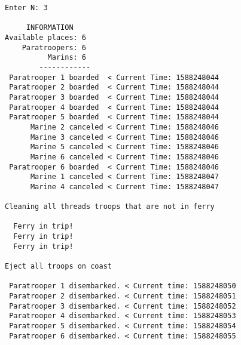 \documentclass{article}
\begin{document}
\begin{lstlisting}[]
Enter N: 3

     INFORMATION
Available places: 6
    Paratroopers: 6
          Marins: 6
        ------------
 Paratrooper 1 boarded  < Current Time: 1588248044 
 Paratrooper 2 boarded  < Current Time: 1588248044 
 Paratrooper 3 boarded  < Current Time: 1588248044 
 Paratrooper 4 boarded  < Current Time: 1588248044 
 Paratrooper 5 boarded  < Current Time: 1588248044 
      Marine 2 canceled < Current Time: 1588248046 
      Marine 3 canceled < Current Time: 1588248046 
      Marine 5 canceled < Current Time: 1588248046 
      Marine 6 canceled < Current Time: 1588248046 
 Paratrooper 6 boarded  < Current Time: 1588248046 
      Marine 1 canceled < Current Time: 1588248047 
      Marine 4 canceled < Current Time: 1588248047 

Cleaning all threads troops that are not in ferry

  Ferry in trip!
  Ferry in trip!
  Ferry in trip!

Eject all troops on coast

 Paratrooper 1 disembarked. < Current time: 1588248050
 Paratrooper 2 disembarked. < Current time: 1588248051
 Paratrooper 3 disembarked. < Current time: 1588248052
 Paratrooper 4 disembarked. < Current time: 1588248053
 Paratrooper 5 disembarked. < Current time: 1588248054
 Paratrooper 6 disembarked. < Current time: 1588248055

\end{lstlisting}
\newpage
\end{document}
